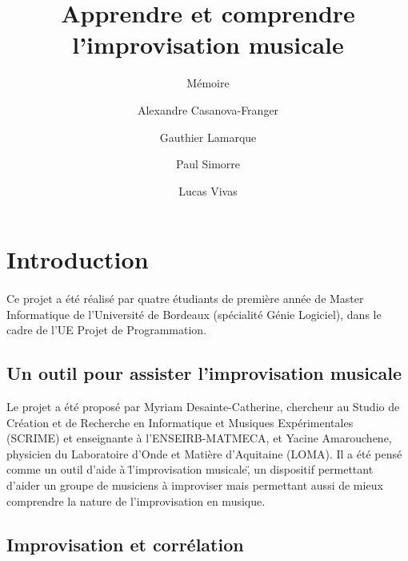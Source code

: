 \documentclass{article}
\title{Apprendre et comprendre l'improvisation musicale}
\subtitle{Mémoire}
\author{Alexandre Casanova-Franger\\
  \and
  Gauthier Lamarque\\
  \and
  Paul Simorre\\
  \and
  Lucas Vivas\\}
\begin{document}
\malketitle
\section{Introduction}
\paragraph{}
Ce projet a été réalisé par quatre étudiants de première année de Master Informatique de l'Université de Bordeaux (spécialité Génie Logiciel), dans le cadre de l'UE Projet de Programmation.

\subsection{Un outil pour assister l'improvisation musicale}
Le projet a été proposé par Myriam Desainte-Catherine, chercheur au Studio de Création et de Recherche en Informatique et Musiques Expérimentales (SCRIME) et enseignante à l'ENSEIRB-MATMECA, et Yacine Amarouchene, physicien du Laboratoire d'Onde et Matière d'Aquitaine (LOMA). Il a été pensé comme un outil d'aide à \"l'improvisation musicale\", un dispositif permettant d'aider un groupe de musiciens à improviser mais permettant aussi de mieux comprendre la nature de l'improvisation en musique.

\subsection{Improvisation et corrélation}
\end{document}

